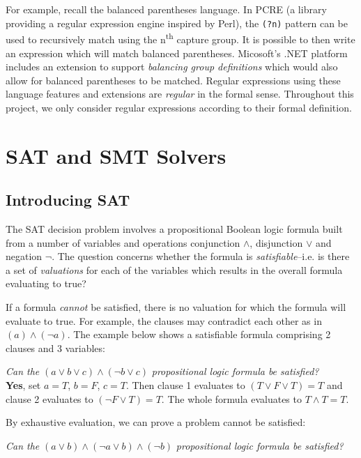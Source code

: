 \documentclass[a4paper,openany,12pt]{book}
\begin{document}
For example, recall the balanced parentheses language. In PCRE (a library providing a regular expression engine inspired by Perl), the \texttt{(?n)} pattern can be used to recursively match using the n\textsuperscript{th} capture group. It is possible to then write an expression which will match balanced parentheses. Micosoft's .NET platform includes an extension to support \emph{balancing group definitions} which would also allow for balanced parentheses to be matched. Regular expressions using these language features and extensions are \emph{regular} in the formal sense. Throughout this project, we only consider regular expressions according to their formal definition.

\section{SAT and SMT Solvers}

\subsection{Introducing SAT}

The SAT decision problem involves a propositional Boolean logic formula built from a number of variables and operations conjunction $\land$, disjunction $\lor$ and negation $\neg$. The question concerns whether the formula is \emph{satisfiable}--i.e. is there a set of \emph{valuations} for each of the variables which results in the overall formula evaluating to true?

If a formula \emph{cannot} be satisfied, there is no valuation for which the formula will evaluate to true. For example, the clauses may contradict each other as in $(a) \land (\neg a)$. The example below shows a satisfiable formula comprising 2 clauses and 3 variables:


\emph{Can the} \(
	(a \lor b \lor c) \land (\neg b \lor c)
\) \emph{propositional logic formula be satisfied?}\\

\textcolor{id7-emerald-green}{\textbf{Yes}}, set $a = T$, $b=F$, $c=T$. Then clause 1 evaluates to $(T \lor F \lor T) = T$ and clause 2 evaluates to $(\neg F \lor T) = T$. The whole formula evaluates to $T \land T = T$.

By exhaustive evaluation, we can prove a problem cannot be satisfied:

\emph{Can the} \(
    (a \lor b) \land (\neg a \lor b) \land (\neg b)
\) \emph{propositional logic formula be satisfied?}\\
\end{document}
